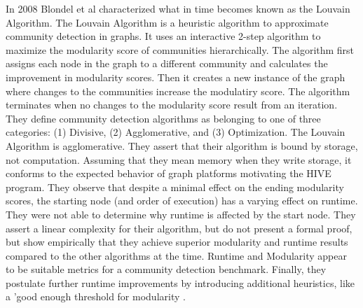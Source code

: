\par{In 2008 Blondel et al characterized what in time becomes known as the Louvain Algorithm. 
The Louvain Algorithm is a heuristic algorithm to approximate community detection in graphs. 
It uses an interactive 2-step algorithm to maximize the modularity score of communities hierarchically. 
The algorithm first assigns each node in the graph to a different community and calculates the improvement in modularity scores. 
Then it creates a new instance of the graph where changes to the communities increase the modulatiry score. 
The algorithm terminates when no changes to the modularity score result from an iteration. 
They define community detection algorithms as belonging to one of three categories: (1) Divisive, (2) Agglomerative, and (3) Optimization. The Louvain Algorithm is agglomerative. 
They assert that their algorithm is bound by storage, not computation. 
Assuming that they mean memory when they write storage, it conforms to the expected behavior of graph platforms motivating the HIVE program.
They observe that despite a minimal effect on the ending modularity scores, the starting node (and order of execution) has a varying effect on runtime. 
They were not able to determine why runtime is affected by the start node. 
They assert a linear complexity for their algorithm, but do not present a formal proof, but show empirically that they achieve superior modularity and runtime results compared to the other algorithms at the time. 
Runtime and Modularity appear to be suitable metrics for a community detection benchmark. 
Finally, they postulate further runtime improvements by introducing additional heuristics, like a 'good enough threshold for modularity \cite{Blondel2008}.}

